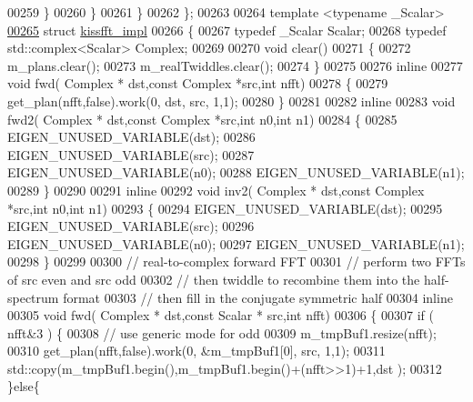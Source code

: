\begin{DoxyCode}
00259         \}
00260       \}
00261     \}
00262 \};
00263 
00264 \textcolor{keyword}{template} <\textcolor{keyword}{typename} \_Scalar>
\hyperlink{struct_eigen_1_1internal_1_1kissfft__impl}{00265} \textcolor{keyword}{struct }\hyperlink{struct_eigen_1_1internal_1_1kissfft__impl}{kissfft\_impl}
00266 \{
00267   \textcolor{keyword}{typedef} \_Scalar Scalar;
00268   \textcolor{keyword}{typedef} std::complex<Scalar> Complex;
00269 
00270   \textcolor{keywordtype}{void} clear() 
00271   \{
00272     m\_plans.clear();
00273     m\_realTwiddles.clear();
00274   \}
00275 
00276   \textcolor{keyword}{inline}
00277     \textcolor{keywordtype}{void} fwd( Complex * dst,\textcolor{keyword}{const} Complex *src,\textcolor{keywordtype}{int} nfft)
00278     \{
00279       get\_plan(nfft,\textcolor{keyword}{false}).work(0, dst, src, 1,1);
00280     \}
00281 
00282   \textcolor{keyword}{inline}
00283     \textcolor{keywordtype}{void} fwd2( Complex * dst,\textcolor{keyword}{const} Complex *src,\textcolor{keywordtype}{int} n0,\textcolor{keywordtype}{int} n1)
00284     \{
00285         EIGEN\_UNUSED\_VARIABLE(dst);
00286         EIGEN\_UNUSED\_VARIABLE(src);
00287         EIGEN\_UNUSED\_VARIABLE(n0);
00288         EIGEN\_UNUSED\_VARIABLE(n1);
00289     \}
00290 
00291   \textcolor{keyword}{inline}
00292     \textcolor{keywordtype}{void} inv2( Complex * dst,\textcolor{keyword}{const} Complex *src,\textcolor{keywordtype}{int} n0,\textcolor{keywordtype}{int} n1)
00293     \{
00294         EIGEN\_UNUSED\_VARIABLE(dst);
00295         EIGEN\_UNUSED\_VARIABLE(src);
00296         EIGEN\_UNUSED\_VARIABLE(n0);
00297         EIGEN\_UNUSED\_VARIABLE(n1);
00298     \}
00299 
00300   \textcolor{comment}{// real-to-complex forward FFT}
00301   \textcolor{comment}{// perform two FFTs of src even and src odd}
00302   \textcolor{comment}{// then twiddle to recombine them into the half-spectrum format}
00303   \textcolor{comment}{// then fill in the conjugate symmetric half}
00304   \textcolor{keyword}{inline}
00305     \textcolor{keywordtype}{void} fwd( Complex * dst,\textcolor{keyword}{const} Scalar * src,\textcolor{keywordtype}{int} nfft) 
00306     \{
00307       \textcolor{keywordflow}{if} ( nfft&3  ) \{
00308         \textcolor{comment}{// use generic mode for odd}
00309         m\_tmpBuf1.resize(nfft);
00310         get\_plan(nfft,\textcolor{keyword}{false}).work(0, &m\_tmpBuf1[0], src, 1,1);
00311         std::copy(m\_tmpBuf1.begin(),m\_tmpBuf1.begin()+(nfft>>1)+1,dst );
00312       \}\textcolor{keywordflow}{else}\{

\end{DoxyCode}
